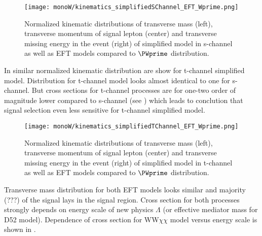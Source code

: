 \begin{figure}[hb]
\texttt{[image: monoW/kinematics\_simplifiedSChannel\_EFT\_Wprime.png]}
\caption{Normalized kinematic distributions of transverse mass (left), transverse momentum of signal lepton (center) and transverse missing energy in the event (right) of simplified model in s-channel as well as EFT models compared to $\PWprime$ distribution.}
  \label{fig:kinematicsSChannel}
\end{figure}

In  similar normalized kinematic distribution are show for t-channel simplified model. Distribution for t-channel model looks almost identical to one
for s-channel. But cross sections for t-channel processes are for one-two order of magnitude lower compared to s-channel (see ) which leads to conclution
that signal selection even less sensitive for t-channel simplified model.

\begin{figure}[hb]
\texttt{[image: monoW/kinematics\_simplifiedTChannel\_EFT\_Wprime.png]}
\caption{Normalized kinematic distributions of transverse mass (left), transverse momentum of signal lepton (center) and transverse missing energy in the event (right) of simplified model in t-channel as well as EFT models compared to $\PWprime$ distribution.}
  \label{fig:kinematicsTChannel}
\end{figure}

Transverse mass distribution for both EFT models looks similar and majority (???) of the signal lays in the signal region. 
Cross section for both processes strongly depends on energy scale of new physics $\Lambda$ (or effective mediator mass for D52 model).
Dependence of cross section for WW$\chi\chi$ model versus energy scale is shown in . 



